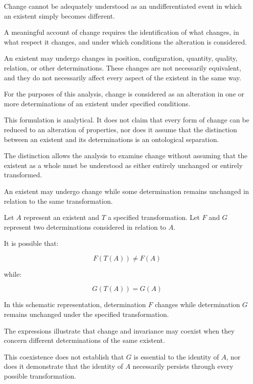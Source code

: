 Change cannot be adequately understood as an
undifferentiated event in which an existent simply
becomes different.

A meaningful account of change requires the
identification of what changes, in what respect
it changes, and under which conditions the alteration
is considered.

An existent may undergo changes in position,
configuration, quantity, quality, relation, or
other determinations. These changes are not
necessarily equivalent, and they do not necessarily
affect every aspect of the existent in the same way.

For the purposes of this analysis, change is
considered as an alteration in one or more
determinations of an existent under specified
conditions.

This formulation is analytical. It does not
claim that every form of change can be reduced
to an alteration of properties, nor does it
assume that the distinction between an existent
and its determinations is an ontological
separation.

The distinction allows the analysis to examine
change without assuming that the existent as
a whole must be understood as either entirely
unchanged or entirely transformed.


An existent may undergo change while some
determination remains unchanged in relation
to the same transformation.

Let \(A\) represent an existent and \(T\)
a specified transformation. Let \(F\) and
\(G\) represent two determinations considered
in relation to \(A\).

It is possible that:

\[
F(T(A)) \neq F(A)
\]

while:

\[
G(T(A)) = G(A)
\]

In this schematic representation, determination
\(F\) changes while determination \(G\) remains
unchanged under the specified transformation.

The expressions illustrate that change and
invariance may coexist when they concern
different determinations of the same existent.

This coexistence does not establish that
\(G\) is essential to the identity of \(A\),
nor does it demonstrate that the identity
of \(A\) necessarily persists through every
possible transformation.

